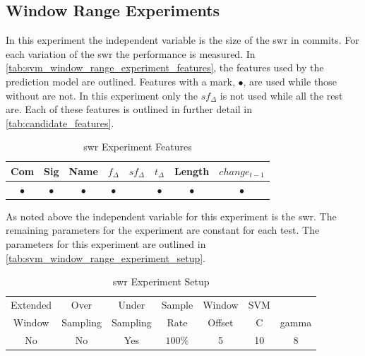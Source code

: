 \subsection{Window Range Experiments}
\label{sec:svm_swr_experiment}


In this experiment the independent variable is the size of the \gls{swr} in commits. For each variation of the \gls{swr} the performance is measured. In \autoref{tab:svm_window_range_experiment_features}, the features used by the prediction model are outlined. Features with a mark, $\bullet$, are used while those without are not. In this experiment only the $sf_{\Delta}$ is not used while all the rest are. Each of these features is outlined in further detail in \autoref{tab:candidate_features}.

\begin{table}[h]
\begin{center}

    \begin{tabular}{|c|c|c|c|c|c|c|c|}
        \hline
        Com & Sig & Name & $f_{\Delta}$ & $sf_{\Delta}$ & $t_\Delta$ & Length & $change_{t-1}$ \\
        \hline
        $\bullet$ & $\bullet$ & $\bullet$ & $\bullet$ & & $\bullet$ & $\bullet$ & $\bullet$ \\ \hline
    \end{tabular}
    \caption{\gls{swr} Experiment Features}
    \label{tab:svm_window_range_experiment_features}
\end{center}
\end{table}


As noted above the independent variable for this experiment is the \gls{swr}. The remaining parameters for the experiment are constant for each test. The parameters for this experiment are outlined in \autoref{tab:svm_window_range_experiment_setup}.

\begin{table}[h]
\begin{center}

    \begin{tabular}{|c|c|c|c|c|cc|}
        \hline
        Extended & Over & Under & Sample & Window & SVM & \\
        Window & Sampling & Sampling & Rate & Offset & C & gamma \\ \hline
        No & No & Yes & $100\%$ & 5 & 10 & 8 \\ \hline
    \end{tabular}
    \caption{\gls{swr} Experiment Setup}
    \label{tab:svm_window_range_experiment_setup}
\end{center}

\end{table}

